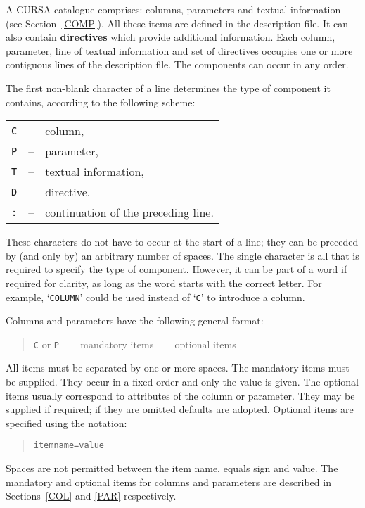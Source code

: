 \documentclass[twoside,11pt]{article}
\renewcommand{\_}{\texttt{\symbol{95}}}
\begin{document}
A CURSA catalogue comprises: columns, parameters and textual information
(see Section~\ref{COMP}).  All these items are defined in the description
file.  It can also contain {\bf directives} which provide additional
information.  Each column, parameter, line of textual information and set
of directives occupies one or more contiguous lines of the description
file.  The components can occur in any order.

The first non-blank character of a line determines the type of component
it contains, according to the following scheme:

\begin{tabular}{lcl}
{\tt C} & -- & column,              \\
{\tt P} & -- & parameter,           \\
{\tt T} & -- & textual information, \\
{\tt D} & -- & directive,           \\
{\tt :} & -- & continuation of the preceding line.  \\
\end{tabular}

These characters do not have to occur at the start of a line; they can
be preceded by (and only by) an arbitrary number of spaces.  The single
character is all that is required to specify the type of component.
However, it can be part of a word if required for clarity, as long as
the word starts with the correct letter.  For example, `{\tt COLUMN}'
could be used instead of `{\tt C}' to introduce a column.

Columns and parameters have the following general format:

\begin{quote}
{\tt C} or {\tt P} ~~~ mandatory items ~~~ optional items
\end{quote}

All items must be separated by one or more spaces.  The
mandatory items must be supplied.  They occur in a fixed order and
only the value is given.  The optional items usually
correspond to attributes of the column or parameter.  They may be
supplied if required; if they are omitted defaults are adopted.
Optional items are specified using the notation:

\begin{quote}
{\tt item\_name=value}
\end{quote}

Spaces are not permitted between the item name, equals sign and value.
The mandatory and optional items for columns and parameters are
described in Sections~\ref{COL} and \ref{PAR} respectively.
\end{document}
